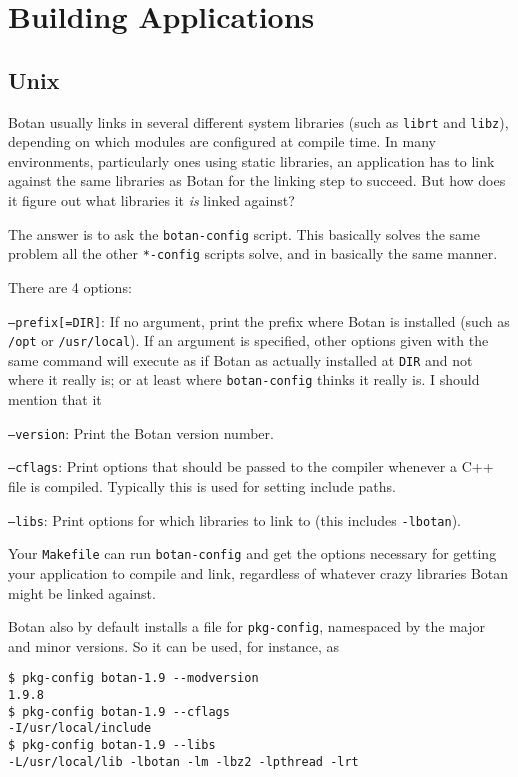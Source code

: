 \documentclass{article}
\newcommand{\filename}[1]{\texttt{#1}}
\begin{document}
\section{Building Applications}

\subsection{Unix}

Botan usually links in several different system libraries (such as
\texttt{librt} and \texttt{libz}), depending on which modules are
configured at compile time. In many environments, particularly ones
using static libraries, an application has to link against the same
libraries as Botan for the linking step to succeed. But how does it
figure out what libraries it \emph{is} linked against?

The answer is to ask the \filename{botan-config} script. This
basically solves the same problem all the other \filename{*-config}
scripts solve, and in basically the same manner.

There are 4 options:

\texttt{--prefix[=DIR]}: If no argument, print the prefix where Botan
is installed (such as \filename{/opt} or \filename{/usr/local}). If an
argument is specified, other options given with the same command will
execute as if Botan as actually installed at \filename{DIR} and not
where it really is; or at least where \filename{botan-config} thinks
it really is. I should mention that it

\texttt{--version}: Print the Botan version number.

\texttt{--cflags}: Print options that should be passed to the compiler
whenever a C++ file is compiled. Typically this is used for setting
include paths.

\texttt{--libs}: Print options for which libraries to link to (this includes
\texttt{-lbotan}).

Your \filename{Makefile} can run \filename{botan-config} and get the
options necessary for getting your application to compile and link,
regardless of whatever crazy libraries Botan might be linked against.

Botan also by default installs a file for \texttt{pkg-config},
namespaced by the major and minor versions. So it can be used,
for instance, as

\begin{verbatim}
$ pkg-config botan-1.9 --modversion
1.9.8
$ pkg-config botan-1.9 --cflags
-I/usr/local/include
$ pkg-config botan-1.9 --libs
-L/usr/local/lib -lbotan -lm -lbz2 -lpthread -lrt
\end{verbatim}
\end{document}
